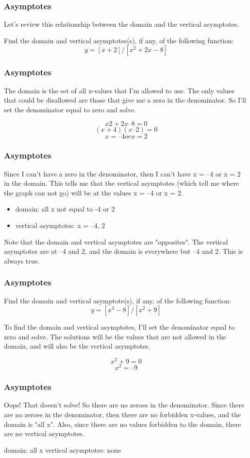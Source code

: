\documentclass{beamer}
\begin{document}
\begin{frame}
	\frametitle{Asymptotes}
	\Large



Let's review this relationship between the domain and the vertical asymptotes.

Find the domain and vertical asymptotes(s), if any, of the following function:
\[y = [x + 2] / [x^2 + 2x - 8]\]


\end{frame}
\begin{frame}
	\frametitle{Asymptotes}
	\Large
The domain is the set of all x-values that I'm allowed to use. The only values that could be disallowed are those that give me a zero in the denominator. So I'll set the denominator equal to zero and solve.

\[x2 + 2x – 8 = 0 \]
\[(x + 4)(x – 2) = 0\] 
\[x = –4 or x = 2\]

\end{frame}
\begin{frame}
	\frametitle{Asymptotes}
	\Large
Since I can't have a zero in the denominator, then I can't have x = –4 or x = 2 in the domain. This tells me that the vertical asymptotes (which tell me where the graph can not go) will be at the values x = –4 or x = 2.

\begin{itemize}
\item domain:   all x not equal to -4 or 2 
\item vertical asymptotes:  x = –4, 2
\end{itemize}
Note that the domain and vertical asymptotes are "opposites". The vertical asymptotes are at –4 and 2, and the domain is everywhere but –4 and 2. This is always true.
\end{frame}
\begin{frame}
	\frametitle{Asymptotes}
	\Large
Find the domain and vertical asymptote(s), if any, of the following function:
\[y = [x^3 - 8] / [x^2 + 9]\]

To find the domain and vertical asymptotes, I'll set the denominator equal to zero and solve. The solutions will be the values that are not allowed in the domain, and will also be the vertical asymptotes.

\[x^2 + 9 = 0 \]
\[x^2 = –9\]

\end{frame}
\begin{frame}
	\frametitle{Asymptotes}
	\Large
Oops! That doesn't solve! So there are no zeroes in the denominator. Since there are no zeroes in the denominator, then there are no forbidden x-values, and the domain is "all x". Also, since there are no values forbidden to the domain, there are no vertical asymptotes.

domain:  all x 
vertical asymptotes:  none
\end{frame}
\end{document}
